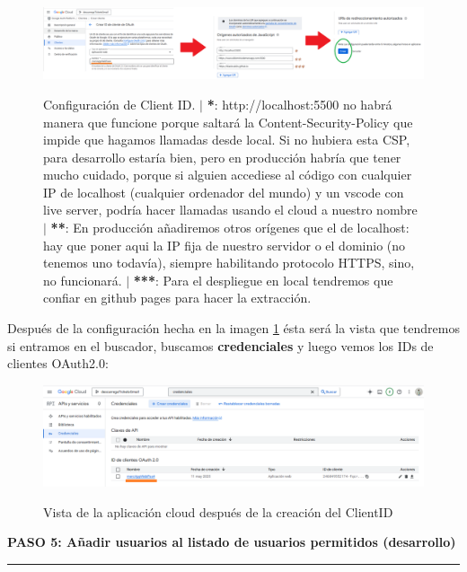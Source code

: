 \documentclass[a4paper,12pt]{report}
\begin{document}
	
	\FloatBarrier
	\setlength{\belowcaptionskip}{3pt}
	\begin{figure}[H]
		\centering
		\caption{Configuración de Client ID.  $|$ \textbf{*}: http://localhost:5500 no habrá manera que funcione porque saltará la Content-Security-Policy que impide que hagamos llamadas desde local. Si no hubiera esta CSP, para desarrollo estaría bien, pero en producción habría que tener mucho cuidado, porque si alguien accediese al código con cualquier IP de localhost (cualquier ordenador del mundo) y un vscode con live server, podría hacer llamadas usando el cloud a nuestro nombre  $|$ \textbf{**}: En producción añadiremos otros orígenes que el de localhost: hay que poner aqui la IP fija de nuestro servidor o el dominio (no tenemos uno todavía), siempre habilitando protocolo HTTPS, sino, no funcionará. $|$ \textbf{***}: Para el despliegue en local tendremos que confiar en github pages para hacer la extracción.}
		\includegraphics[width=1\linewidth]{img/googleCloudE.png} 
		\label{fig:googleCloudE}
	\end{figure}
	\FloatBarrier
	
	
	
	Después de la configuración hecha en la imagen \ref{fig:googleCloudE} ésta será la vista que tendremos si entramos en el buscador, buscamos \textbf{credenciales} y luego vemos los IDs de clientes OAuth2.0:
	
	\FloatBarrier
	\setlength{\belowcaptionskip}{3pt}
	\begin{figure}[H]
		\centering
		\caption{Vista de la aplicación cloud después de la creación del ClientID}
		\includegraphics[width=1\linewidth]{img/googleCloudF}
		\label{fig:googleCloudF}
	\end{figure}
	\FloatBarrier
	
	
	
	\noindent \textbf{PASO 5: Añadir usuarios al listado de usuarios permitidos (desarrollo)}
	\vspace{.1em}
	\hrule
	\vspace{.5em}
	
\end{document}
